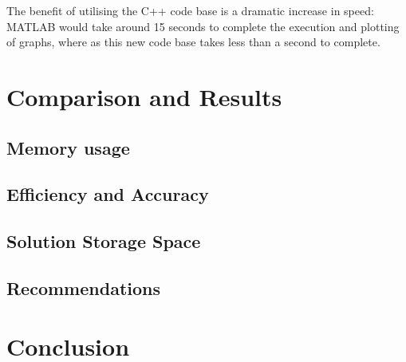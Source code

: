 \documentclass[11pt,draftd]{article}
\begin{document}
The benefit of utilising the C++ code base is a dramatic increase in speed: MATLAB would take around 15 seconds to complete the execution and plotting of graphs, where as this new code base takes less than a second to complete.

\newpage

\section{Comparison and Results}
\subsection{Memory usage}
\subsection{Efficiency and Accuracy}
\subsection{Solution Storage Space}

\subsection{Recommendations}

\newpage 

\section{Conclusion}

\newpage
\end{document}
